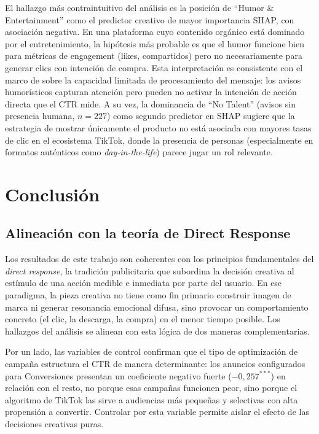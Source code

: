 \documentclass[12pt, a4paper]{report}
\begin{document}
El hallazgo más contraintuitivo del análisis es la posición de ``Humor
\& Entertainment'' como el predictor creativo de mayor importancia SHAP,
con asociación negativa. En una plataforma cuyo contenido orgánico está
dominado por el entretenimiento, la hipótesis más probable es que el
humor funcione bien para métricas de engagement (likes, compartidos)
pero no necesariamente para generar clics con intención de compra. Esta
interpretación es consistente con el marco de \citet{lang2000} sobre la
capacidad limitada de procesamiento del mensaje: los avisos humorísticos
capturan atención pero pueden no activar la intención de acción directa
que el CTR mide. A su vez, la dominancia de ``No Talent'' (avisos sin
presencia humana, $n = 227$) como segundo predictor en SHAP sugiere que
la estrategia de mostrar únicamente el producto no está asociada con
mayores tasas de clic en el ecosistema TikTok, donde la presencia de
personas (especialmente en formatos auténticos como
\textit{day-in-the-life}) parece jugar un rol relevante.

\chapter{Conclusión}

\section{Alineación con la teoría de Direct Response}

Los resultados de este trabajo son coherentes con los principios fundamentales del
\textit{direct response}, la tradición publicitaria que subordina la decisión creativa al
estímulo de una acción medible e inmediata por parte del usuario. En ese paradigma, la
pieza creativa no tiene como fin primario construir imagen de marca ni generar resonancia
emocional difusa, sino provocar un comportamiento concreto (el clic, la descarga, la
compra) en el menor tiempo posible. Los hallazgos del análisis se alinean con esta lógica
de dos maneras complementarias.

Por un lado, las variables de control confirman que el tipo de optimización de campaña
estructura el CTR de manera determinante: los anuncios configurados para Conversiones
presentan un coeficiente negativo fuerte ($-0{,}257^{***}$) en relación con el resto, no
porque esas campañas funcionen peor, sino porque el algoritmo de TikTok las sirve a
audiencias más pequeñas y selectivas con alta propensión a convertir. Controlar por esta
variable permite aislar el efecto de las decisiones creativas puras.
\end{document}
